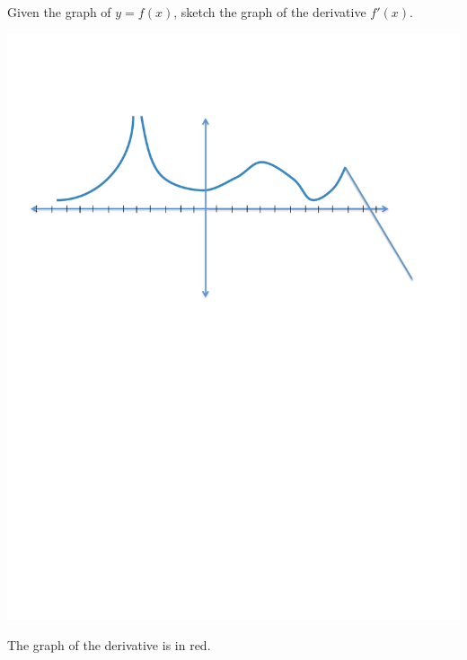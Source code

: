 \documentclass[handout,nooutcomes]{ximera}
\begin{document}
\begin{problem}
Given the graph of $y=f(x)$, sketch the graph of the derivative $f'(x)$.

	\begin{image}
	\includegraphics[trim= 220 430 250 110]{Figure5.pdf}
	\end{image}

		\begin{freeResponse}
		The graph of the derivative is in red.
		

\end{freeResponse}
\end{problem}
\end{document}
